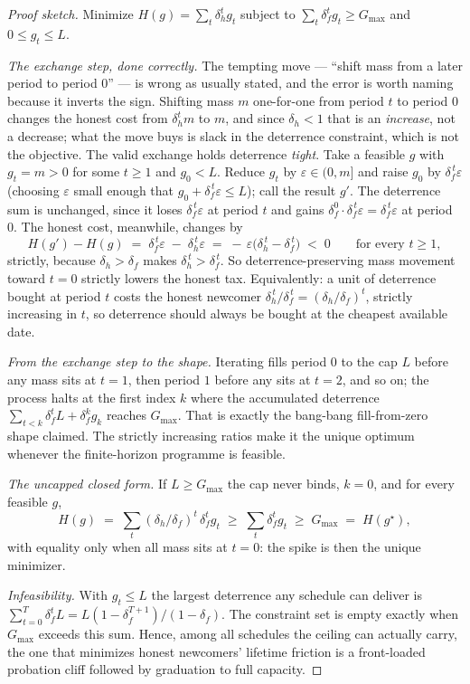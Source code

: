 \documentclass[11pt,a4paper]{article}
\theoremstyle{definition}
\begin{document}



\begin{proof}[Proof sketch]
\setlength{\parskip}{4pt plus 1pt}
Minimize $H(g)=\sum_t \delta_h^t g_t$ subject to $\sum_t \delta_f^t g_t\ge G_{\max}$
and $0\le g_t\le L$.

\emph{The exchange step, done correctly.} The tempting move --- ``shift mass from a
later period to period $0$'' --- is wrong as usually stated, and the error is worth
naming because it inverts the sign. Shifting mass $m$ one-for-one from period $t$ to
period $0$ changes the honest cost from $\delta_h^t m$ to $m$, and since
$\delta_h<1$ that is an \emph{increase}, not a decrease; what the move buys is
slack in the deterrence constraint, which is not the objective. The valid exchange
holds deterrence \emph{tight}. Take a feasible $g$ with $g_t=m>0$ for some $t\ge 1$
and $g_0<L$. Reduce $g_t$ by $\varepsilon\in(0,m]$ and raise $g_0$ by
$\delta_f^{\,t}\varepsilon$ (choosing $\varepsilon$ small enough that
$g_0+\delta_f^{\,t}\varepsilon\le L$); call the result $g'$. The deterrence sum is
unchanged, since it
loses $\delta_f^{\,t}\varepsilon$ at period $t$ and gains
$\delta_f^{0}\cdot\delta_f^{\,t}\varepsilon=\delta_f^{\,t}\varepsilon$ at period
$0$. The honest cost, meanwhile, changes by
\[
  H(g')-H(g) \;=\; \delta_f^{\,t}\varepsilon \;-\; \delta_h^{\,t}\varepsilon
  \;=\; -\,\varepsilon\bigl(\delta_h^{\,t}-\delta_f^{\,t}\bigr) \;<\; 0
  \qquad\text{for every } t\ge 1,
\]
strictly, because $\delta_h>\delta_f$ makes $\delta_h^{\,t}>\delta_f^{\,t}$. So
deterrence-preserving mass movement toward $t=0$ strictly lowers the honest tax.
Equivalently: a unit of deterrence bought at period $t$ costs the honest newcomer
$\delta_h^{\,t}/\delta_f^{\,t}=(\delta_h/\delta_f)^t$, strictly increasing in $t$,
so deterrence should always be bought at the cheapest available date.

\emph{From the exchange step to the shape.} Iterating fills period $0$ to the cap
$L$ before any mass sits at $t=1$, then period $1$ before any sits at $t=2$, and so
on; the process halts at the first index $k$ where the accumulated deterrence
$\sum_{t<k}\delta_f^t L + \delta_f^k g_k$ reaches $G_{\max}$. That is exactly the
bang-bang fill-from-zero shape claimed. The strictly increasing ratios make it
the unique optimum whenever the finite-horizon programme is feasible.

\emph{The uncapped closed form.} If $L\ge G_{\max}$ the cap never binds, $k=0$, and
for every feasible $g$,
\[
  H(g)\;=\;\sum_t (\delta_h/\delta_f)^t\,\delta_f^t g_t
  \;\ge\;\sum_t \delta_f^t g_t\;\ge\; G_{\max}\;=\;H(g^\star),
\]
with equality only when all mass sits at $t=0$: the spike is then the unique
minimizer.

\emph{Infeasibility.} With $g_t\le L$ the largest deterrence any schedule can
deliver is $\sum_{t=0}^{T}\delta_f^t L=L(1-\delta_f^{T+1})/(1-\delta_f)$.
The constraint set is empty exactly when $G_{\max}$ exceeds this sum. Hence,
among all schedules the ceiling can actually carry, the one that minimizes honest
newcomers' lifetime friction is a front-loaded probation cliff followed by
graduation to full capacity.
\end{proof}
\end{document}
